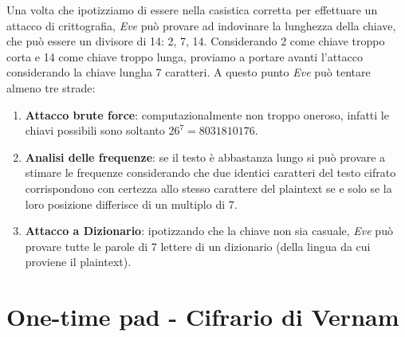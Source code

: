 Una volta che ipotizziamo di essere nella casistica corretta per effettuare un attacco di crittografia, \textit{Eve} può provare ad indovinare la lunghezza della chiave, che può essere un divisore di 14: 2, 7, 14. Considerando 2 come chiave troppo corta e 14 come chiave troppo lunga, proviamo a portare avanti l'attacco considerando la chiave lungha 7 caratteri. A questo punto \textit{Eve} può tentare almeno tre strade:
\begin{enumerate}
    \item \textbf{Attacco brute force}: computazionalmente non troppo oneroso, infatti le chiavi possibili sono soltanto $26^7 = 8031810176$.
    \item \textbf{Analisi delle frequenze}: se il testo è abbastanza lungo si può provare a stimare le frequenze considerando che due identici caratteri del testo cifrato corrispondono con certezza allo stesso carattere del plaintext se e solo se la loro posizione differisce di un multiplo di 7.
    \item \textbf{Attacco a Dizionario}: ipotizzando che la chiave non sia casuale, \textit{Eve} può provare tutte le parole di 7 lettere di un dizionario (della lingua da cui proviene il plaintext).
\end{enumerate}

\newpage
\section{One-time pad - Cifrario di Vernam}

